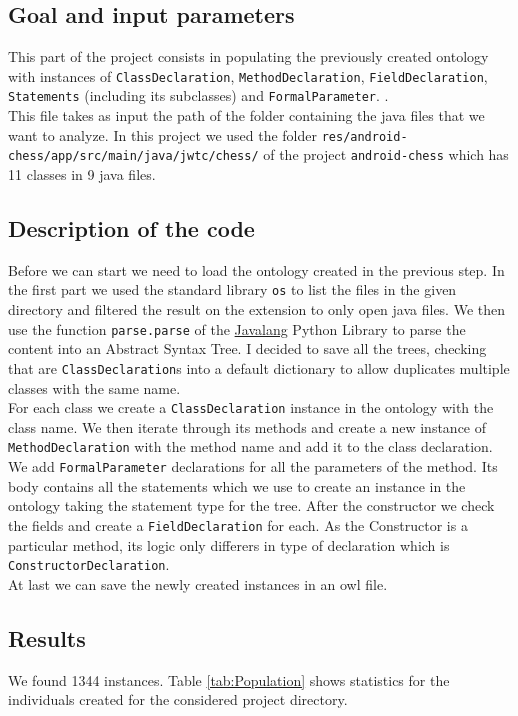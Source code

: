 \documentclass [14 pt]{article}
\begin{document}
\subsection{Goal and input parameters}
This part of the project consists in populating the previously created ontology with instances of \texttt{ClassDeclaration}, \texttt{MethodDeclaration}, \texttt{FieldDeclaration}, \texttt{Statements} (including its subclasses) and \texttt{FormalParameter}.
 .\\
This file takes as input the path of the folder containing the java files that we want to analyze. In this project we used the folder \texttt{res/android-chess/app/src/main/java/jwtc/chess/} of the project \texttt{android-chess} which has 11 classes in 9 java files. 

\subsection{Description of the code}
Before we can start we need to load the ontology created in the previous step. In the first part we used the standard library \texttt{os} to list the files in the given directory and filtered the result on the extension to only open java files. We then use the function \texttt{parse.parse} of the \href{https://github.com/c2nes/javalang}{Javalang} Python Library to parse the content into an Abstract Syntax Tree. I decided to save all the trees, checking that are \texttt{ClassDeclaration}s into a default dictionary to allow duplicates multiple classes with the same name.\\
For each class we create a \texttt{ClassDeclaration} instance in the ontology with the class name. We then iterate through its methods and create a new instance of \texttt{MethodDeclaration} with the method name and add it to the class declaration. We add \texttt{FormalParameter} declarations for all the parameters of the method. Its body contains all the statements which we use to create an instance in the ontology taking the statement type for the tree.
After the constructor we check the fields and create a \texttt{FieldDeclaration} for each.
As the Constructor is a particular method, its logic only differers in type of declaration which is \texttt{ConstructorDeclaration}. \\
At last we can save the newly created instances in an owl file.

\subsection{Results}
We found 1344 instances. 
Table \ref{tab:Population} shows statistics for the individuals created for the considered project directory.
\end{document}
